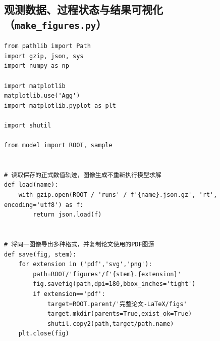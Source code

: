\subsection{观测数据、过程状态与结果可视化（\texttt{make\_figures.py}）}
\begin{Verbatim}[fontsize=\scriptsize,breaklines=true,breakanywhere=true]
from pathlib import Path
import gzip, json, sys
import numpy as np

import matplotlib
matplotlib.use('Agg')
import matplotlib.pyplot as plt

import shutil

from model import ROOT, sample


# 读取保存的正式数值轨迹，图像生成不重新执行模型求解
def load(name):
    with gzip.open(ROOT / 'runs' / f'{name}.json.gz', 'rt', encoding='utf8') as f:
        return json.load(f)


# 将同一图像导出多种格式，并复制论文使用的PDF图源
def save(fig, stem):
    for extension in ('pdf','svg','png'):
        path=ROOT/'figures'/f'{stem}.{extension}'
        fig.savefig(path,dpi=180,bbox_inches='tight')
        if extension=='pdf':
            target=ROOT.parent/'完整论文-LaTeX/figs'
            target.mkdir(parents=True,exist_ok=True)
            shutil.copy2(path,target/path.name)
    plt.close(fig)



\end{Verbatim}
